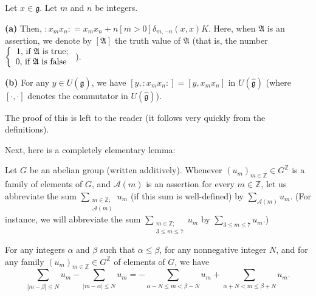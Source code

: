 \documentclass[etingof-lie.tex]{subfiles}
\begin{document}
\begin{remark}
\label{rmk.sugawara.normal.K}Let $x\in\mathfrak{g}$. Let $m$ and $n$ be integers.

\textbf{(a)} Then, $\left.  :x_{m}x_{n}:\right.  =x_{m}x_{n}+n\left[
m>0\right]  \delta_{m,-n}\left(  x,x\right)  K$. Here, when $\mathfrak{A}$ is
an assertion, we denote by $\left[  \mathfrak{A}\right]  $ the truth value of
$\mathfrak{A}$ (that is, the number $\left\{
\begin{array}
[c]{c}%
1\text{, if }\mathfrak{A}\text{ is true;}\\
0\text{, if }\mathfrak{A}\text{ is false }%
\end{array}
\right.  $).

\textbf{(b)} For any $y\in U\left(  \widehat{\mathfrak{g}}\right)  $, we have
$\left[  y,\left.  :x_{m}x_{n}:\right.  \right]  =\left[  y,x_{m}x_{n}\right]
$ in $U\left(  \widehat{\mathfrak{g}}\right)  $ (where $\left[  \cdot
,\cdot\right]  $ denotes the commutator in $U\left(  \widehat{\mathfrak{g}%
}\right)  $).
\end{remark}

The proof of this is left to the reader (it follows very quickly from the definitions).

Next, here is a completely elementary lemma:

\begin{lemma}
\label{lem.telescope}Let $G$ be an abelian group (written additively).
Whenever $\left(  u_{m}\right)  _{m\in\mathbb{Z}}\in G^{\mathbb{Z}}$ is a
family of elements of $G$, and $\mathcal{A}\left(  m\right)  $ is an assertion
for every $m\in\mathbb{Z}$, let us abbreviate the sum $\sum
\limits_{\substack{m\in\mathbb{Z};\\\mathcal{A}\left(  m\right)  }}u_{m}$ (if
this sum is well-defined) by $\sum\limits_{\mathcal{A}\left(  m\right)  }%
u_{m}$. (For instance, we will abbreviate the sum $\sum\limits_{\substack{m\in
\mathbb{Z};\\3\leq m\leq7}}u_{m}$ by $\sum\limits_{3\leq m\leq7}u_{m}$.)

For any integers $\alpha$ and $\beta$ such that $\alpha\leq\beta$, for any
nonnegative integer $N$, and for any family $\left(  u_{m}\right)
_{m\in\mathbb{Z}}\in G^{\mathbb{Z}}$ of elements of $G$, we have%
\[
\sum\limits_{\left\vert m-\beta\right\vert \leq N}u_{m}-\sum
\limits_{\left\vert m-\alpha\right\vert \leq N}u_{m}=-\sum\limits_{\alpha
-N\leq m<\beta-N}u_{m}+\sum\limits_{\alpha+N<m\leq\beta+N}u_{m}.
\]

\end{lemma}
\end{document}
